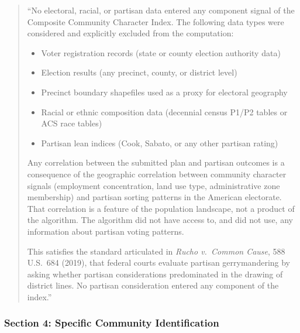 \begin{quote}
``No electoral, racial, or partisan data entered any component signal of
the Composite Community Character Index.
The following data types were considered and explicitly excluded from
the computation:
\begin{itemize}
  \item Voter registration records (state or county election authority data)
  \item Election results (any precinct, county, or district level)
  \item Precinct boundary shapefiles used as a proxy for electoral geography
  \item Racial or ethnic composition data (decennial census P1/P2 tables or
    ACS race tables)
  \item Partisan lean indices (Cook, Sabato, or any other partisan rating)
\end{itemize}

Any correlation between the submitted plan and partisan outcomes is a consequence
of the geographic correlation between community character signals (employment
concentration, land use type, administrative zone membership) and partisan
sorting patterns in the American electorate.
That correlation is a feature of the population landscape, not a product of
the algorithm.
The algorithm did not have access to, and did not use, any information about
partisan voting patterns.

This satisfies the standard articulated in \textit{Rucho v.\ Common Cause},
588 U.S.\ 684 (2019), that federal courts evaluate partisan gerrymandering
by asking whether partisan considerations predominated in the drawing of
district lines.
No partisan consideration entered any component of the index.''
\end{quote}

\subsubsection*{Section 4: Specific Community Identification}

